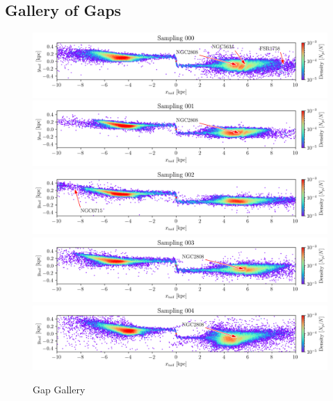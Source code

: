 \documentclass[draft]{aa}
\begin{document}
\begin{appendix}
  \section{Gallery of Gaps} \label{appendix:gallery_of_gaps}

    \begin{figure}
      \centering
      \includegraphics[width=\linewidth]{gallery_of_gaps_monte-carlo-000.png}
      \includegraphics[width=\linewidth]{gallery_of_gaps_monte-carlo-001.png}
      \includegraphics[width=\linewidth]{gallery_of_gaps_monte-carlo-002.png}
      \includegraphics[width=\linewidth]{gallery_of_gaps_monte-carlo-003.png}
      \includegraphics[width=\linewidth]{gallery_of_gaps_monte-carlo-004.png}
      \caption{Gap Gallery}
      \label{fig:TailCoordinates}
    \end{figure}    



\end{appendix}
\end{document}
